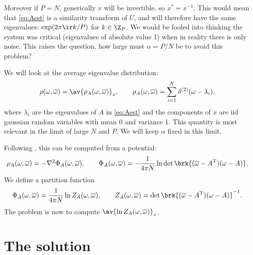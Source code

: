 \documentclass[12pt]{article}
\newcommand{\inv}{^{-1}}
\newcommand{\trans}{^\mathrm{T}}
\newcommand{\omb}{\overline{\omega}}
\begin{document}
Moreover if $P=N$, generically $x$ will be invertible, so $x^*=x\inv$.
This would mean that \eqref{eq:Aest} is a similarity transform of $U$, and will therefore have the same eigenvalues: $\exp(2\pi\ir k/P)$ for $k\in\Z_P$.
We would be fooled into thinking the system was critical (eigenvalues of absolute value 1) when in reality there is only noise.
This raises the question, how large must $\alpha=P/N$ be to avoid this problem? 

We will look at the average eigenvalue distribution:
%
\begin{equation}\label{eq:eigdist}
  \rho(\omega,\omb) = \av{\rho_A(\omega,\omb)}_x,
  \qquad
  \rho_A(\omega,\omb) = \sum_{i=1}^N \delta^{(2)}(\omega-\lambda_i),
\end{equation}
%
where $\lambda_i$ are the eigenvalues of $A$ in \eqref{eq:Aest} and
the components of $x$ are iid gaussian random variables with mean 0 and variance 1.
This quantity is most relevant in the limit of large $N$ and $P$.
We will keep $\alpha$ fixed in this limit.

Following \cite{Sommers1988asymmetric}, this can be computed from a potential:
%
\begin{equation}\label{eq:potential}
  \rho_A(\omega,\omb) = -\nabla^2 \Phi_A(\omega,\omb),
  \qquad
  \Phi_A(\omega,\omb) = -\frac{1}{4\pi N} \ln\det \brk{(\omb-A\trans)(\omega-A)}.
\end{equation}
%
We define a partition function
%
\begin{equation}\label{eq:partfn}
  \Phi_A(\omega,\omb) = \frac{1}{4\pi N} \ln Z_A(\omega,\omb),
  \qquad
  Z_A(\omega,\omb) = \det \brk{(\omb-A\trans)(\omega-A)}\inv.
\end{equation}
%
The problem is now to compute $\av{\ln Z_A(\omega,\omb)}_x$.


\section{The solution}\label{sec:solution}
\end{document}
